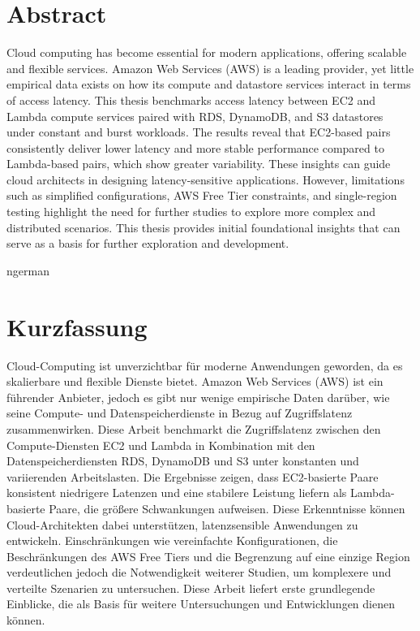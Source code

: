 \documentclass[a4paper, 11pt]{article}
\begin{document}


\newpage

\section*{Abstract}
Cloud computing has become essential for modern applications, offering scalable and flexible services. Amazon Web Services (AWS) is a leading provider, yet little empirical data exists on how its compute and datastore services interact in terms of access latency. This thesis benchmarks access latency between EC2 and Lambda compute services paired with RDS, DynamoDB, and S3 datastores under constant and burst workloads. The results reveal that EC2-based pairs consistently deliver lower latency and more stable performance compared to Lambda-based pairs, which show greater variability. These insights can guide cloud architects in designing latency-sensitive applications. However, limitations such as simplified configurations, AWS Free Tier constraints, and single-region testing highlight the need for further studies to explore more complex and distributed scenarios. This thesis provides initial foundational insights that can serve as a basis for further exploration and development.

\clearpage
\begin{otherlanguage}
    {ngerman}
    \section*{Kurzfassung}
    Cloud-Computing ist unverzichtbar für moderne Anwendungen geworden, da es skalierbare und flexible Dienste bietet. Amazon Web Services (AWS) ist ein führender Anbieter, jedoch es gibt nur wenige empirische Daten darüber, wie seine Compute- und Datenspeicherdienste in Bezug auf Zugriffslatenz zusammenwirken. Diese Arbeit benchmarkt die Zugriffslatenz zwischen den Compute-Diensten EC2 und Lambda in Kombination mit den Datenspeicherdiensten RDS, DynamoDB und S3 unter konstanten und variierenden Arbeitslasten. Die Ergebnisse zeigen, dass EC2-basierte Paare konsistent niedrigere Latenzen und eine stabilere Leistung liefern als Lambda-basierte Paare, die größere Schwankungen aufweisen. Diese Erkenntnisse können Cloud-Architekten dabei unterstützen, latenzsensible Anwendungen zu entwickeln. Einschränkungen wie vereinfachte Konfigurationen, die Beschränkungen des AWS Free Tiers und die Begrenzung auf eine einzige Region verdeutlichen jedoch die Notwendigkeit weiterer Studien, um komplexere und verteilte Szenarien zu untersuchen. Diese Arbeit liefert erste grundlegende Einblicke, die als Basis für weitere Untersuchungen und Entwicklungen dienen können.
\end{otherlanguage}
\end{document}
